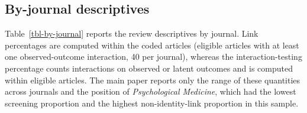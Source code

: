 \documentclass[
  man,
  floatsintext,
  longtable,
  nolmodern,
  notxfonts,
  notimes,
  colorlinks=true,linkcolor=blue,citecolor=blue,urlcolor=blue]{apa7}
\begin{document}
\subsection{By-journal descriptives}\label{by-journal-descriptives}

Table~\ref{tbl-by-journal} reports the review descriptives by journal.
Link percentages are computed within the coded articles (eligible
articles with at least one observed-outcome interaction, 40 per
journal), whereas the interaction-testing percentage counts interactions
on observed or latent outcomes and is computed within eligible articles.
The main paper reports only the range of these quantities across
journals and the position of \emph{Psychological Medicine}, which had
the lowest screening proportion and the highest non-identity-link
proportion in this sample.
\end{document}
